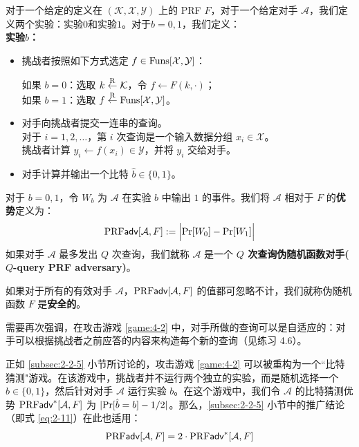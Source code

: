\begin{game}[伪随机函数]\label{game:4-2}
对于一个给定的定义在 $(\mathcal{K},\mathcal{X},\mathcal{Y})$ 上的 PRF $F$，对于一个给定对手 $\mathcal{A}$，我们定义两个实验：实验$0$和实验$1$。对于$b=0,1$，我们定义：\\
\noindent\textbf{实验$b$：}
\begin{itemize}
	\item 挑战者按照如下方式选定 $f\in{\rm Funs}[\mathcal{X},\mathcal{Y}]$：
	\vspace{1pt}
	
	\hspace*{5pt} 如果 $b=0$：选取 $k\overset{\rm R}\leftarrow\mathcal{K}$，令 $f\leftarrow F(k,\cdot)$；\\
	\hspace*{5pt} 如果 $b=1$：选取 $f\overset{\rm R}\leftarrow{\rm Funs}[\mathcal{X},\mathcal{Y}]$。
	\item 对手向挑战者提交一连串的查询。\\
	对于 $i=1,2,\dots$，第 $i$ 次查询是一个输入数据分组 $x_i\in\mathcal{X}$。\\
	挑战者计算 $y_i\leftarrow f(x_i)\in\mathcal{Y}$，并将 $y_i$ 交给对手。
	\item 对手计算并输出一个比特 $\hat{b}\in\{0,1\}$。
\end{itemize}
对于 $b=0,1$，令 $W_b$ 为 $\mathcal{A}$ 在实验 $b$ 中输出 $1$ 的事件。我们将 $\mathcal{A}$ 相对于 $F$ 的\textbf{优势}定义为：
\begin{equation}\label{eq:4-21}
{\rm PRF\mathsf{adv}}[\mathcal{A}, F]:=
\Big\lvert
{\rm Pr}[W_0]-{\rm Pr}[W_1]
\Big\rvert
\end{equation}
如果对手 $\mathcal{A}$ 最多发出 $Q$ 次查询，我们就称 $\mathcal{A}$ 是一个 \textbf{$Q$ 次查询伪随机函数对手($Q$-query PRF adversary)}。
\end{game}

\begin{definition}\label{def:4-2}
如果对于所有的有效对手 $\mathcal{A}$，${\rm PRF\mathsf{adv}}[\mathcal{A},F]$ 的值都可忽略不计，我们就称伪随机函数 $F$ 是\textbf{安全的}。
\end{definition}

需要再次强调，在攻击游戏 \ref{game:4-2} 中，对手所做的查询可以是自适应的：对手可以根据挑战者之前应答的内容来构造每个新的查询（见练习 4.6）。

正如 \ref{subsec:2-2-5} 小节所讨论的，攻击游戏 \ref{game:4-2} 可以被重构为一个``比特猜测"游戏。在该游戏中，挑战者并不运行两个独立的实验，而是随机选择一个 $b\in\{0,1\}$，然后针对对手 $\mathcal{A}$ 运行实验 $b$。在这个游戏中，我们令 $\mathcal{A}$ 的比特猜测优势 ${\rm PRF\mathsf{adv}}^*[\mathcal{A}, F]$ 为 $|{\rm Pr}[\hat{b}=b]-{1}/{2}|$。那么，\ref{subsec:2-2-5} 小节中的推广结论（即式 \ref{eq:2-11}）在此也适用：
\begin{equation}
{\rm PRF\mathsf{adv}}[\mathcal{A}, F]=2\cdot {\rm PRF\mathsf{adv}}^*[\mathcal{A}, F]
\end{equation}

